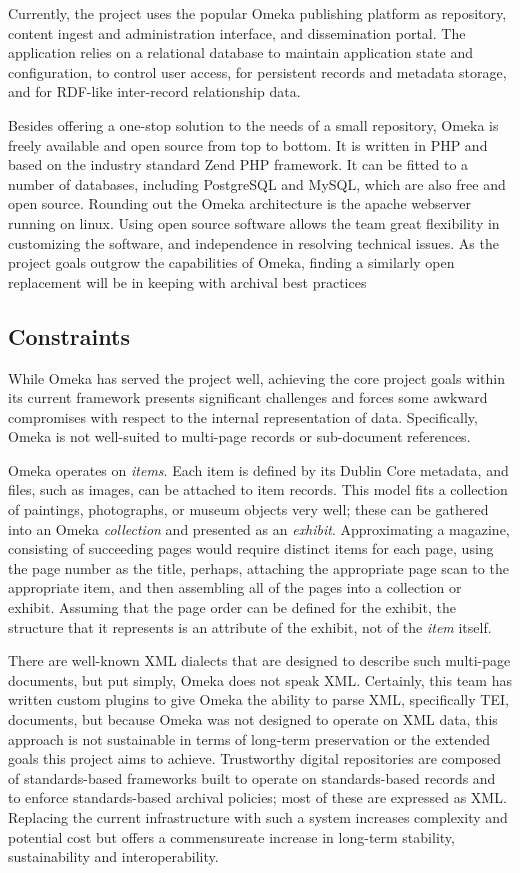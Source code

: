Currently, the project uses the popular Omeka publishing platform as repository, content ingest and administration interface, and dissemination portal. The application relies on a relational database to maintain application state and configuration, to control user access, for persistent records and metadata storage, and for RDF-like inter-record relationship data. 

Besides offering a one-stop solution to the needs of a small repository, Omeka is freely available and open source from top to bottom. It is written in PHP and based on the industry standard Zend PHP framework. It can be fitted to a number of databases, including PostgreSQL and MySQL, which are also free and open source. Rounding out the Omeka architecture is the apache webserver running on linux. Using open source software allows the team great flexibility in customizing the software, and independence in resolving technical issues. As the project goals outgrow the capabilities of Omeka, finding a similarly open replacement will be in keeping with archival best practices \needcite

\subsection{Constraints}
While Omeka has served the project well, achieving the core project goals within its current framework presents significant challenges and forces some awkward compromises  with respect to the internal representation of data. Specifically, Omeka is not well-suited to multi-page records or sub-document references. 

Omeka operates on \emph{items}. Each item is defined by its Dublin Core metadata, and files, such as images, can be attached to item records. This model fits a collection of paintings, photographs, or museum objects very well; these can be gathered into an Omeka \emph{collection} and presented as an \emph{exhibit}. Approximating a magazine, consisting of succeeding pages would require distinct items for each page, using the page number as the title, perhaps, attaching the appropriate page scan to the appropriate item, and then assembling all of the pages into a collection or exhibit. Assuming that the page order can be defined for the exhibit, the structure that it represents is an attribute of the exhibit, not of the \emph{item} itself. 

There are well-known XML dialects that are designed to describe such multi-page documents, but put simply, Omeka does not speak XML. Certainly, this team has written custom plugins to give Omeka the ability to parse XML, specifically TEI, documents, but because Omeka was not designed to operate on XML data, this approach is not sustainable in terms of long-term preservation or the extended goals this project aims to achieve. Trustworthy digital repositories are composed of standards-based frameworks built to operate on standards-based records and to enforce standards-based archival policies; most of these are expressed as XML. Replacing the current infrastructure with such a system increases complexity and potential cost but offers a commensureate increase in long-term stability, sustainability and interoperability. 